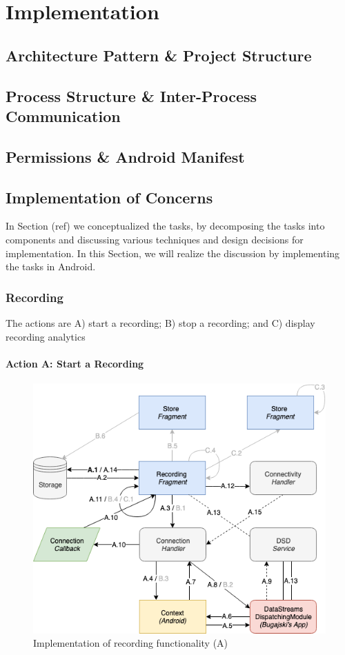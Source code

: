 \chapter{Implementation}

\section{Architecture Pattern \& Project Structure}
\section{Process Structure \& Inter-Process Communication}
\section{Permissions \& Android Manifest}

\section{Implementation of Concerns}
In Section (ref) we conceptualized the tasks, by decomposing the tasks into components and discussing various techniques and design decisions for implementation. In this Section, we will realize the discussion by implementing the tasks in Android. 

\subsection{Recording}

The actions are A) start a recording; B) stop a recording; and C) display recording analytics

\subsubsection{Action A: Start a Recording}
\begin{figure}
    \centering
    \includegraphics[scale=0.6]{images/Recording_ImpA.png}
    \caption{Implementation of recording functionality (A)}
    \label{fig:impl_recordingA}
\end{figure}

